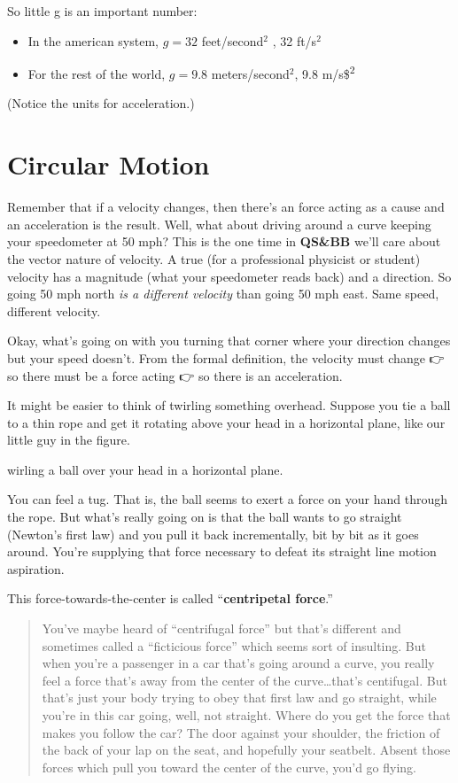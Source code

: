 \documentclass[
  letterpaper,
  DIV=11,
  numbers=noendperiod,
  oneside]{scrreprt}
\providecommand{\tightlist}{%
  \setlength{\itemsep}{0pt}\setlength{\parskip}{0pt}}\usepackage{longtable,booktabs,array}
\begin{document}
So little g is an important number:

\begin{itemize}
\tightlist
\item
  In the american system, \(g = 32\) feet/second\(^2\) , 32 ft/s\(^2\)
\item
  For the rest of the world, \(g = 9.8\) meters/second\(^2\), 9.8
  m/s\$\textsuperscript{2}
\end{itemize}

(Notice the units for acceleration.)

\section{Circular Motion}\label{sec-circular}

Remember that if a velocity changes, then there's an force acting as a
cause and an acceleration is the result. Well, what about driving around
a curve keeping your speedometer at 50 mph? This is the one time in
\textbf{QS\&BB} we'll care about the vector nature of velocity. A true
(for a professional physicist or student) velocity has a magnitude (what
your speedometer reads back) and a direction. So going 50 mph north
\emph{is a different velocity} than going 50 mph east. Same speed,
different velocity.

Okay, what's going on with you turning that corner where your direction
changes but your speed doesn't. From the formal definition, the velocity
must change 👉 so there must be a force acting 👉 so there is an
acceleration.

It might be easier to think of twirling something overhead. Suppose you
tie a ball to a thin rope and get it rotating above your head in a
horizontal plane, like our little guy in the figure.

wirling a ball over your head in a horizontal plane.

You can feel a tug. That is, the ball seems to exert a force on your
hand through the rope. But what's really going on is that the ball wants
to go straight (Newton's first law) and you pull it back incrementally,
bit by bit as it goes around. You're supplying that force necessary to
defeat its straight line motion aspiration.

This force-towards-the-center is called ``\textbf{centripetal force}.''

\begin{quote}
You've maybe heard of ``centrifugal force'' but that's different and
sometimes called a ``ficticious force'' which seems sort of insulting.
But when you're a passenger in a car that's going around a curve, you
really feel a force that's away from the center of the
curve\ldots that's centifugal. But that's just your body trying to obey
that first law and go straight, while you're in this car going, well,
not straight. Where do you get the force that makes you follow the car?
The door against your shoulder, the friction of the back of your lap on
the seat, and hopefully your seatbelt. Absent those forces which pull
you toward the center of the curve, you'd go flying.
\end{quote}
\end{document}
